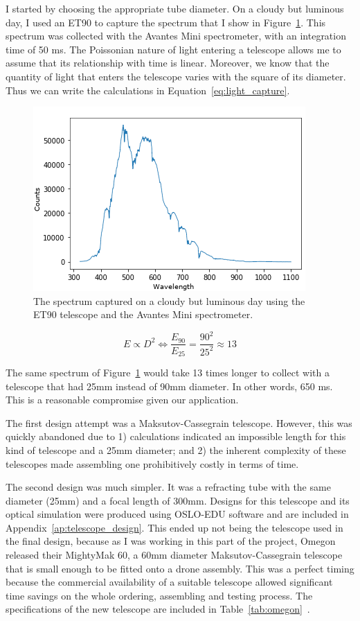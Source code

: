 I started by choosing the appropriate tube diameter. On a cloudy but
luminous day, I used an ET90 to capture the spectrum that I show in
Figure~\ref{fig:cloudy_but_luminous_day}. This spectrum was collected
with the Avantes Mini spectrometer, with an integration time of 50 ms.
The Poissonian nature of light entering a telescope allows me to assume
that its relationship with time is linear. Moreover, we know that the
quantity of light that enters the telescope varies with the square of
its diameter. Thus we can write the calculations in
Equation~\ref{eq:light_capture}.

\begin{figure}[htpb]
    \centering
    \includegraphics[width=.6\textwidth]{img/png/ex_spectrum.png}
    \caption{The spectrum captured on a cloudy but luminous day using
    the ET90 telescope and the Avantes Mini spectrometer.}%
    \label{fig:cloudy_but_luminous_day}
\end{figure}

\begin{equation}
    \label{eq:light_capture}
    E \propto D^2 \Leftrightarrow \frac{E_{90}}{E_{25}} =
    \frac{90^2}{25^2} \approx 13
\end{equation}

The same spectrum of Figure~\ref{fig:cloudy_but_luminous_day} would take
13 times longer to collect with a telescope that had 25mm instead of
90mm diameter. In other words, 650 ms. This is a reasonable compromise
given our application.

The first design attempt was a Maksutov-Cassegrain telescope. However,
this was quickly abandoned due to 1) calculations indicated an
impossible length for this kind of telescope and a 25mm diameter; and 2)
the inherent complexity of these telescopes made assembling one
prohibitively costly in terms of time.

The second design was much simpler. It was a refracting tube with the
same diameter (25mm) and a focal length of 300mm. Designs for this
telescope and its optical simulation were produced using OSLO-EDU
software and are included in Appendix~\ref{ap:telescope_design}. This
ended up not being the telescope used in the final design, because as I
was working in this part of the project, Omegon released their MightyMak
60, a 60mm diameter Maksutov-Cassegrain telescope that is small enough
to be fitted onto a drone assembly. This was a perfect timing because
the commercial availability of a suitable telescope allowed significant
time savings on the whole ordering, assembling and testing process. The
specifications of the new telescope are included in
Table~\ref{tab:omegon}~\cite{Omegon2021}.

